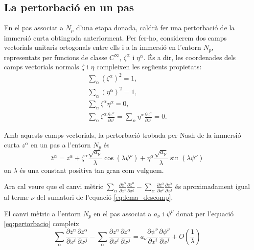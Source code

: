 \subsection{La pertorbació en un pas}
En el pas associat a $N_p$ d'una etapa donada, caldrà fer una pertorbació de la immersió curta obtinguda anteriorment. Per fer-ho, considerem dos camps vectorials unitaris ortogonals entre ells i a la immersió en l'entorn $N_p$, representats per funcions de classe $C^\infty$, $\zeta^\alpha$ i $\eta^\alpha$. 
És a dir, les coordenades dels camps vectorials normals $\zeta$ i $\eta$ compleixen les següents propietats:
\begin{align*}
    \sum_\alpha (\zeta^\alpha)^2 = 1, \\
    \sum_\alpha (\eta^\alpha)^2 = 1, \\
    \sum_\alpha \zeta^\alpha\eta^\alpha = 0, \\
    \sum_\alpha \zeta^\alpha\frac{\partial z^\alpha}{\partial x^i} = \sum_\alpha \eta^\alpha\frac{\partial z^\alpha}{\partial x^i} = 0.
\end{align*}

Amb aquests camps vectorials, la pertorbació trobada per Nash de la immersió curta $z^\alpha$ en un pas a l'entorn $N_p$ és
\begin{equation}\label{eq:pertorbacio}
    \boxed{\overline{z}^\alpha = z^\alpha + \zeta^\alpha\frac{\sqrt{a_\nu}}{\lambda}\cos(\lambda \psi^\nu) + \eta^\alpha\frac{\sqrt{a_\nu}}{\lambda}\sin(\lambda \psi^\nu)}
\end{equation}
on $\lambda$ és una constant positiva tan gran com vulguem.

Ara cal veure que el canvi mètric $\sum_\alpha\frac{\partial\overline{z}^\alpha}{\partial x^i}\frac{\partial\overline{z}^\alpha}{\partial x^j}-\sum_\alpha\frac{\partial z^\alpha}{\partial x^i}\frac{\partial z^\alpha}{\partial x^j}$ és aproximadament igual al terme $\nu$ del sumatori de l'equació \ref{eq:lema_descomp}.

\begin{prop}\label{prop:mida_pertorbacio}
    El canvi mètric a l'entorn $N_p$ en el pas associat a $a_\nu$ i $\psi^\nu$ donat per l'equació \ref{eq:pertorbacio} compleix
    \begin{equation}\label{eq:pertorbacio_cota}
        \sum_\alpha\frac{\partial\overline{z}^\alpha}{\partial x^i}\frac{\partial\overline{z}^\alpha}{\partial x^j}-\sum_\alpha\frac{\partial z^\alpha}{\partial x^i}\frac{\partial z^\alpha}{\partial x^j} =  a_\nu \frac{\partial\psi^\nu}{\partial x^i}\frac{\partial\psi^\nu}{\partial x^j} + O\left(\frac1\lambda\right)
    \end{equation}
\end{prop}

